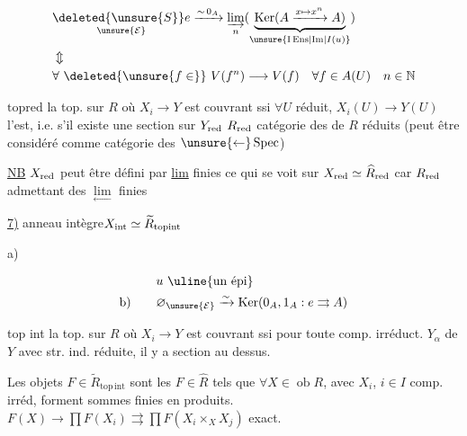 \[
\begin{aligned}
&\underset{\unsure{\mathcal E}}{\deleted{\unsure{S}}e}
 \xrightarrow[\ ]{\sim\,0_A}\varinjlim_n
 (\underbrace{\operatorname{Ker}(A\xrightarrow{x\mapsto x^n} A)}_{\unsure{\mathrm{I\,Ens}|\mathrm{Im}|I(u)}})\\
&\Updownarrow\\
&\forall\ \deleted{\unsure{f\in}}\ V(f^n)\longrightarrow V(f)\quad \forall f\in A(U)\quad n\in\mathbb N
\end{aligned}
\]


$\mathrm{topred}$ la top. sur $R$ où $X_i\to Y$ est couvrant ssi $\forall U$ réduit, $X_i(U)\to Y(U)$ l'est,
i.e. s'il existe une section sur $Y_{\rm red}$ 
$R_{\rm red}$ catégorie des   de $R$ réduits
(peut être  considéré comme catégorie des 
 $\unsure{\leftarrow}\operatorname{Spec}$)

\uline{NB} $X_{\rm red}$ peut être défini par \uline{lim} finies
ce qui se voit sur $X_{\rm red}\simeq\widehat R_{\rm red}$ car $R_{\rm red}$ admettant des $\underset{\leftarrow}{\lim}$ finies

\uline{7)} anneau intègre\quad $X_{\rm int}\simeq\widetilde R_{\mathrm{topint}}$

a)

\[
\begin{aligned}
 &u\ \text{\uline{un épi}}\\
 \text{b)}\qquad&\varnothing_{\unsure{\mathcal E}}\xrightarrow{\sim}\operatorname{Ker}(0_A,1_A:e\rightrightarrows A)
\end{aligned}
\]



top int la top. sur $R$ où $X_i\to Y$ est couvrant ssi pour toute comp. irréduct.
$Y_\alpha$ de $Y$ avec str. ind. réduite, il y a section au dessus.

Les objets $F\in\widetilde R_{\mathrm{top\,int}}$ sont les $F\in\widehat R$ tels que $\forall X\in\operatorname{ob}R$,
avec $X_i$, $i\in I$  comp. irréd,  forment sommes finies en produits.
$F(X)\to\prod F(X_i)\rightrightarrows\prod F(X_i\times_X X_j)$ exact.
